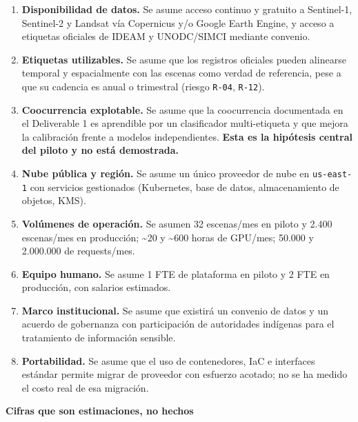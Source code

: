 \documentclass{article}
\newcommand{\mdhfour}[1]{\par\medskip\noindent\textbf{#1}\par\nobreak\smallskip}
\begin{document}
\begin{enumerate}
  \item \textbf{Disponibilidad de datos.} Se asume acceso continuo y gratuito a Sentinel-1, Sentinel-2 y Landsat vía Copernicus y/o Google Earth Engine, y acceso a etiquetas oficiales de IDEAM y UNODC/SIMCI mediante convenio.
  \item \textbf{Etiquetas utilizables.} Se asume que los registros oficiales pueden alinearse temporal y espacialmente con las escenas como verdad de referencia, pese a que su cadencia es anual o trimestral (riesgo \texttt{R-\allowbreak{}04}, \texttt{R-\allowbreak{}12}).
  \item \textbf{Coocurrencia explotable.} Se asume que la coocurrencia documentada en el Deliverable 1 es aprendible por un clasificador multi-etiqueta y que mejora la calibración frente a modelos independientes. \textbf{Esta es la hipótesis central del piloto y no está demostrada.}
  \item \textbf{Nube pública y región.} Se asume un único proveedor de nube en \texttt{us-\allowbreak{}east-\allowbreak{}1} con servicios gestionados (Kubernetes, base de datos, almacenamiento de objetos, KMS).
  \item \textbf{Volúmenes de operación.} Se asumen 32 escenas/mes en piloto y 2.400 escenas/mes en producción; \textasciitilde{}20 y \textasciitilde{}600 horas de GPU/mes; 50.000 y 2.000.000 de requests/mes.
  \item \textbf{Equipo humano.} Se asume 1 FTE de plataforma en piloto y 2 FTE en producción, con salarios estimados.
  \item \textbf{Marco institucional.} Se asume que existirá un convenio de datos y un acuerdo de gobernanza con participación de autoridades indígenas para el tratamiento de información sensible.
  \item \textbf{Portabilidad.} Se asume que el uso de contenedores, IaC e interfaces estándar permite migrar de proveedor con esfuerzo acotado; no se ha medido el costo real de esa migración.
\end{enumerate}

\mdhfour{Cifras que son estimaciones, no hechos}
\end{document}
